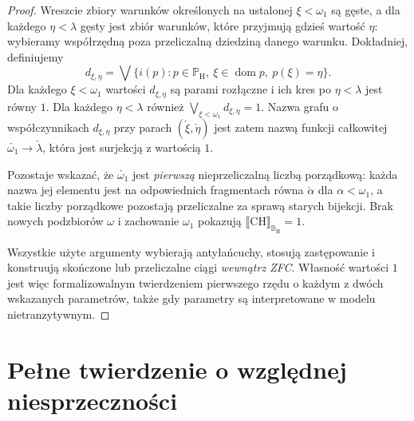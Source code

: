 \begin{proof}
Wreszcie zbiory warunków
określonych na ustalonej
$\xi<\omega_1$ są gęste,
a dla każdego $\eta<\lambda$
gęsty jest zbiór warunków,
które przyjmują gdzieś
wartość $\eta$: wybieramy
współrzędną poza przeliczalną
dziedziną danego warunku.
Dokładniej, definiujemy
\[
 d_{\xi,\eta}
 =\bigvee\{i(p):
     p\in\mathbb P_{\mathrm H},\
     \xi\in\operatorname{dom}p,\
     p(\xi)=\eta\}.
\]
Dla każdego $\xi<\omega_1$
wartości $d_{\xi,\eta}$
są parami rozłączne
i ich kres po
$\eta<\lambda$ jest
równy $1$. Dla każdego
$\eta<\lambda$ również
$\bigvee_{\xi<\omega_1}
 d_{\xi,\eta}=1$.
Nazwa grafu o współczynnikach
$d_{\xi,\eta}$ przy parach
$(\check\xi,\check\eta)$
jest zatem nazwą
funkcji całkowitej
$\check{\omega_1}\to\check\lambda$,
która jest surjekcją
z wartością $1$.

Pozostaje wskazać, że
$\check{\omega_1}$ jest
\emph{pierwszą} nieprzeliczalną
liczbą porządkową:
każda nazwa jej elementu
jest na odpowiednich
fragmentach równa
$\check\alpha$ dla
$\alpha<\omega_1$,
a takie liczby porządkowe
pozostają przeliczalne
za sprawą starych bijekcji.
Brak nowych podzbiorów
$\omega$ i zachowanie
$\omega_1$ pokazują
$\llbracket\mathrm{CH}
\rrbracket_{\mathbb B_{\mathrm H}}=1$.

Wszystkie użyte argumenty
wybierają antyłańcuchy,
stosują zastępowanie i
konstruują skończone lub
przeliczalne ciągi
\emph{wewnątrz ZFC}.
Własność wartości $1$ jest
więc formalizowalnym
twierdzeniem pierwszego rzędu
o każdym z dwóch wskazanych
parametrów, także gdy
parametry są interpretowane
w modelu nietranzytywnym.
\end{proof}

\section{Pełne twierdzenie o względnej niesprzeczności}

